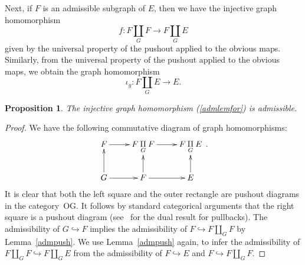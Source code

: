 \documentclass[12pt,times,a4paper]{amsart}
\newtheorem{proposition}[theorem]{Proposition}
\numberwithin{equation}{section}
\numberwithin{equation}{section}
\begin{document}
Next, if $F$ is an admissible subgraph of $E$, then we have the injective graph homomorphism
\begin{equation}\label{admlemfor}
f:F\underset{G}{\amalg}F\longrightarrow F\underset{G}{\amalg}E
\end{equation}
given by the universal property of the pushout applied to the obvious maps.
Similarly, from the universal property of the pushout applied to the obvious maps, 
we obtain the graph homomorphism
\begin{equation}\label{ig}
\iota_g:F\underset{G}{\amalg}E\longrightarrow E.
\end{equation}

\begin{proposition}\label{admlem}
The injective graph homomorphism (\ref{admlemfor}) is admissible. 
\end{proposition}
\begin{proof}
We have the following commutative diagram of graph homomorphisms:
\begin{equation}
\xymatrix{
F \ar[r] &
F\underset{G}{\amalg}F \ar[r] &
F\underset{G}{\amalg}E
\\
G \ar[u] \ar[r] & F \ar[r] \ar[u] & E \ar[u]
}\,.
\end{equation}
It is clear that both the left square and the outer rectangle are pushout diagrams in the category~{\rm OG}. It follows by standard categorical arguments 
that the right square is a pushout diagram (see~\cite[Proposition~11.10]{ahs90} for the dual result for pullbacks). The admissibility of $G\hookrightarrow F$ 
implies the admissibility of $F\hookrightarrow F\amalg_G F$ by Lemma~\ref{admpush}. We use Lemma~\ref{admpush} again, to infer the admissibility of 
$F{\amalg}_GF\hookrightarrow F{\amalg}_GE$ from the admissibility of $F\hookrightarrow E$ and $F\hookrightarrow F\amalg_G F$.
\end{proof}
\end{document}
